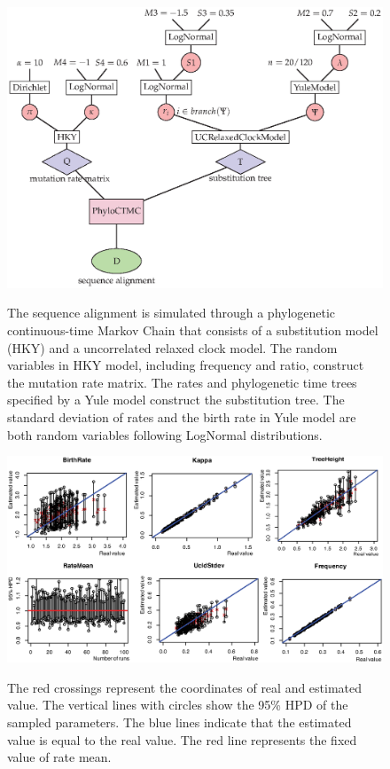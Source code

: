 \documentclass{bmcart}
\begin{document}
\begin{backmatter}
\begin{figure}[h!]
\includegraphics[width=12cm]{ModelValidation.eps}\\
\caption{
             The sequence alignment is simulated through a phylogenetic continuous-time Markov Chain that consists of a substitution model (HKY) and a uncorrelated relaxed clock model. The random variables in HKY model, including frequency and ratio, construct the mutation rate matrix. The rates and phylogenetic time trees specified by a Yule model construct the substitution tree. The standard deviation of rates and the birth rate in Yule model are both random variables following LogNormal distributions.}
\label{modelvalidation}
\end{figure}

\begin{figure}[h!]
\includegraphics[width=12cm]{SmallTree.eps}\\
\caption{
             The red crossings represent the coordinates of real and estimated value. The vertical lines with circles show the 95\% HPD of the sampled parameters. The blue lines indicate that the estimated value is equal to the real value. The red line represents the fixed value of rate mean.}
\label{SmallTree}
\end{figure}


\end{backmatter}
\end{document}
